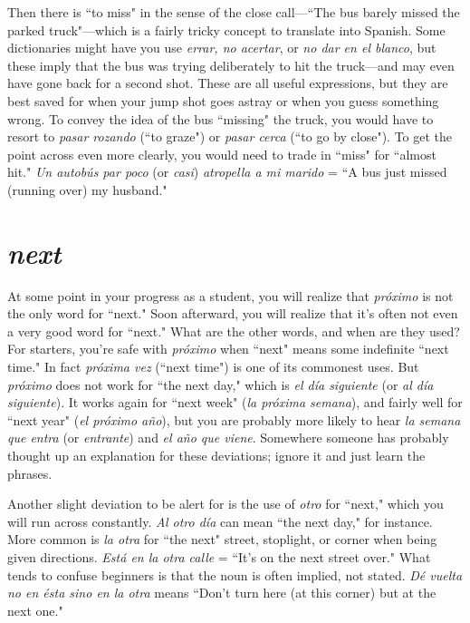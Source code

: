 Then there is ``to miss" in the sense of the close call---``The
bus barely missed the parked truck"---which is a fairly tricky concept
to translate into Spanish. Some dictionaries might have you use \emph{errar,
no acertar}, or \emph{no dar en el blanco}, but these imply that the bus was
trying deliberately to hit the truck---and may even have gone back for
a second shot. These are all useful expressions, but they are best saved
for when your jump shot goes astray or when you guess something
wrong. To convey the idea of the bus ``missing" the truck, you would
have to resort to \emph{pasar rozando} (``to graze") or \emph{pasar cerca} (``to go by
close"). To get the point across even more clearly, you would need to
trade in ``miss" for ``almost hit." \emph{Un autobús par poco} (or \emph{casi}) \emph{atropella a mi marido} = ``A bus just missed (running over) my husband."

\section{\emph{next}}

At some point in your progress as a student, you will realize
that \emph{próximo} is not the only word for ``next." Soon afterward, you will
realize that it's often not even a very good word for ``next." What are
the other words, and when are they used? For starters, you're safe with
\emph{próximo} when ``next" means some indefinite ``next time." In fact
\emph{próxima vez} (``next time") is one of its commonest uses. But \emph{próximo}
does not work for ``the next day," which is \emph{el día siguiente} (or \emph{al día
siguiente}). It works again for ``next week" (\emph{la próxima semana}), and
fairly well for ``next year" (\emph{el próximo año}), but you are probably more
likely to hear \emph{la semana que entra} (or \emph{entrante}) and \emph{el año que viene}.
Somewhere someone has probably thought up an explanation for these
deviations; ignore it and just learn the phrases.

Another slight deviation to be alert for is the use of \emph{otro} for
``next," which you will run across constantly. \emph{Al otro día} can mean
``the next day," for instance. More common is \emph{la otra} for ``the next"
street, stoplight, or corner when being given directions. \emph{Está en la otra
calle} = ``It's on the next street over." What tends to confuse beginners
is that the noun is often implied, not stated. \emph{Dé vuelta no en ésta sino
en la otra} means ``Don't turn here (at this corner) but at the next one."

